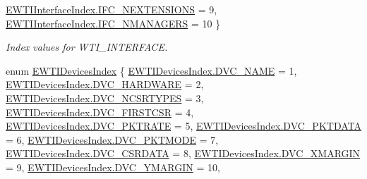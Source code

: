 \begin{DoxyCompactItemize}
\mbox{\hyperlink{namespace_wintab_d_n_a9db915754a02c42282c3766bfbafabe4a914b22675942e67f35a771ed1a6056b0}{E\+W\+T\+I\+Interface\+Index.\+I\+F\+C\+\_\+\+N\+E\+X\+T\+E\+N\+S\+I\+O\+NS}} = 9, 
\mbox{\hyperlink{namespace_wintab_d_n_a9db915754a02c42282c3766bfbafabe4ab00f7004cf3bde5a5eca61ca0c655402}{E\+W\+T\+I\+Interface\+Index.\+I\+F\+C\+\_\+\+N\+M\+A\+N\+A\+G\+E\+RS}} = 10
 \}
\begin{DoxyCompactList}\small\item\em Index values for W\+T\+I\+\_\+\+I\+N\+T\+E\+R\+F\+A\+CE. \end{DoxyCompactList}\item 
enum \mbox{\hyperlink{namespace_wintab_d_n_a87e63128e31d86cb418e895f3d58565c}{E\+W\+T\+I\+Devices\+Index}} \{ \newline
\mbox{\hyperlink{namespace_wintab_d_n_a87e63128e31d86cb418e895f3d58565ca36228a7af166158266b4945b4cf320e8}{E\+W\+T\+I\+Devices\+Index.\+D\+V\+C\+\_\+\+N\+A\+ME}} = 1, 
\mbox{\hyperlink{namespace_wintab_d_n_a87e63128e31d86cb418e895f3d58565ca7ef189500dca51cb5081b1495c36611d}{E\+W\+T\+I\+Devices\+Index.\+D\+V\+C\+\_\+\+H\+A\+R\+D\+W\+A\+RE}} = 2, 
\mbox{\hyperlink{namespace_wintab_d_n_a87e63128e31d86cb418e895f3d58565ca9a9a43ba18c0983ea960b2128a6210df}{E\+W\+T\+I\+Devices\+Index.\+D\+V\+C\+\_\+\+N\+C\+S\+R\+T\+Y\+P\+ES}} = 3, 
\mbox{\hyperlink{namespace_wintab_d_n_a87e63128e31d86cb418e895f3d58565caff267ac1f5895792643f43c45498277f}{E\+W\+T\+I\+Devices\+Index.\+D\+V\+C\+\_\+\+F\+I\+R\+S\+T\+C\+SR}} = 4, 
\newline
\mbox{\hyperlink{namespace_wintab_d_n_a87e63128e31d86cb418e895f3d58565ca8356e002037f9cd3acc6699d5c6decb3}{E\+W\+T\+I\+Devices\+Index.\+D\+V\+C\+\_\+\+P\+K\+T\+R\+A\+TE}} = 5, 
\mbox{\hyperlink{namespace_wintab_d_n_a87e63128e31d86cb418e895f3d58565ca9b24628dcced21dd4f679e90cad593a9}{E\+W\+T\+I\+Devices\+Index.\+D\+V\+C\+\_\+\+P\+K\+T\+D\+A\+TA}} = 6, 
\mbox{\hyperlink{namespace_wintab_d_n_a87e63128e31d86cb418e895f3d58565cae4e7ac8def1a6179016ecec08650f9e0}{E\+W\+T\+I\+Devices\+Index.\+D\+V\+C\+\_\+\+P\+K\+T\+M\+O\+DE}} = 7, 
\mbox{\hyperlink{namespace_wintab_d_n_a87e63128e31d86cb418e895f3d58565ca9d3f0457670a6d7a18f305d93883af1f}{E\+W\+T\+I\+Devices\+Index.\+D\+V\+C\+\_\+\+C\+S\+R\+D\+A\+TA}} = 8, 
\newline
\mbox{\hyperlink{namespace_wintab_d_n_a87e63128e31d86cb418e895f3d58565ca9b1dcd54737d3e341d86338b9834451d}{E\+W\+T\+I\+Devices\+Index.\+D\+V\+C\+\_\+\+X\+M\+A\+R\+G\+IN}} = 9, 
\mbox{\hyperlink{namespace_wintab_d_n_a87e63128e31d86cb418e895f3d58565ca82d911bfa2423df6e0458a1a61e68369}{E\+W\+T\+I\+Devices\+Index.\+D\+V\+C\+\_\+\+Y\+M\+A\+R\+G\+IN}} = 10, 

\end{DoxyCompactItemize}

